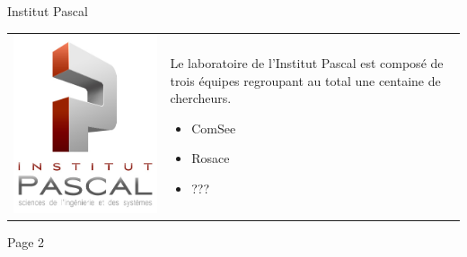 \documentclass{beamer}
\begin{document}
\begin{frame}{Institut Pascal}
  \begin{tabular}{l l}
    \begin{minipage}{0.3\linewidth}
      \includegraphics[width=\linewidth]{images/logo-IP.jpg}
    \end{minipage}
    &
    \begin{minipage}{0.8\linewidth}
      Le laboratoire de l'Institut Pascal est composé de trois équipes regroupant au total une centaine de chercheurs.
      \begin{itemize}
      \item ComSee
      \item Rosace
      \item ???
      \end{itemize}
    \end{minipage}
  \end{tabular}

\end{frame}


\begin{frame}
  Page 2
\end{frame}
\end{document}
